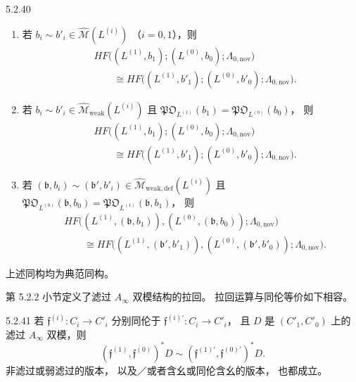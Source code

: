\begin{corollary}{5.2.40}\label{cor:5-2-40}
\begin{enumerate}[label=\textup{(\arabic*)},leftmargin=2.8em]
\item 若
$b_i\sim b'_i
\in\widehat{\mathcal M}(L^{(i)})$
（$i=0,1$），则
\[
\begin{aligned}
&HF\bigl((L^{(1)},b_1);
           (L^{(0)},b_0);
           \Lambda_{0,\mathrm{nov}}\bigr)\\
&\qquad\cong
HF\bigl((L^{(1)},b'_1);
          (L^{(0)},b'_0);
          \Lambda_{0,\mathrm{nov}}\bigr).
\end{aligned}
\]
\item 若
$b_i\sim b'_i
\in\widehat{\mathcal M}_{\mathrm{weak}}
(L^{(i)})$
且
$\mathfrak{PO}_{L^{(1)}}(b_1)
=\mathfrak{PO}_{L^{(0)}}(b_0)$，
则
\[
\begin{aligned}
&HF\bigl((L^{(1)},b_1);
           (L^{(0)},b_0);
           \Lambda_{0,\mathrm{nov}}\bigr)\\
&\qquad\cong
HF\bigl((L^{(1)},b'_1);
          (L^{(0)},b'_0);
          \Lambda_{0,\mathrm{nov}}\bigr).
\end{aligned}
\]
\item 若
$(\mathfrak b,b_i)\sim
(\mathfrak b',b'_i)
\in\widehat{\mathcal M}_{\mathrm{weak,def}}
(L^{(i)})$
且
$\mathfrak{PO}_{L^{(0)}}(\mathfrak b,b_0)
=\mathfrak{PO}_{L^{(1)}}(\mathfrak b,b_1)$，
则
\[
\begin{aligned}
&HF\bigl((L^{(1)},(\mathfrak b,b_1)),
          (L^{(0)},(\mathfrak b,b_0));
          \Lambda_{0,\mathrm{nov}}\bigr)\\
&\qquad\cong
HF\bigl((L^{(1)},(\mathfrak b',b'_1)),
          (L^{(0)},(\mathfrak b',b'_0));
          \Lambda_{0,\mathrm{nov}}\bigr).
\end{aligned}
\]
\end{enumerate}
上述同构均为典范同构。
\end{corollary}

第 5.2.2 小节定义了滤过
$A_\infty$ 双模结构的拉回。
拉回运算与同伦等价如下相容。

\begin{lemma}{5.2.41}\label{lem:5-2-41}
若 $\mathfrak f^{(i)}:C_i\to C'_i$
分别同伦于
$\mathfrak f^{(i)'}:C_i\to C'_i$，
且 $D$ 是 $(C'_1,C'_0)$ 上的滤过
$A_\infty$ 双模，则
\[
(\mathfrak f^{(1)},\mathfrak f^{(0)})^*D
\sim
(\mathfrak f^{(1)'},\mathfrak f^{(0)'})^*D.
\]
非滤过或弱滤过的版本，
以及／或者含幺或同伦含幺的版本，
也都成立。
\end{lemma}

